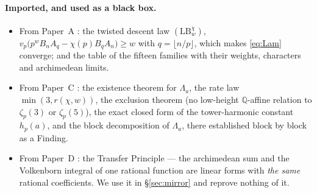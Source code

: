\documentclass[11pt,reqno]{article}
\newcommand{\QQ}{\mathbb{Q}}
\newcommand{\vp}{v_p}
\newcommand{\floor}[1]{\lfloor #1 \rfloor}
\theoremstyle{plain}
\theoremstyle{definition}
\theoremstyle{remark}
\numberwithin{equation}{section}
\begin{document}
\paragraph{Imported, and used as a black box.}
\begin{itemize}[leftmargin=1.4em]
\item From Paper~A \cite{PaperA}: the twisted descent law $(\mathrm{LB}^\chi_w)$,
  $\vp\bigl(p^wB_nA_q-\chi(p)B_qA_n\bigr)\ge w$ with $q=\floor{n/p}$, which makes
  \eqref{eq:Lam} converge; and the table of the fifteen families with their
  weights, characters and archimedean limits.
\item From Paper~C \cite{PaperC}: the existence theorem for $\Lambda_a$, the rate
  law $\min(3,r(\chi,w))$, the exclusion theorem (no low-height $\QQ$-affine
  relation to $\zeta_p(3)$ or $\zeta_p(5)$), the exact closed form of the
  tower-harmonic constant $h_p(a)$, and the block decomposition of $\Lambda_a$,
  there established block by block as a Finding.
\item From Paper~D \cite{PaperD}: the Transfer Principle --- the archimedean sum
  and the Volkenborn integral of one rational function are linear forms with
  \emph{the same} rational coefficients.  We use it in \S\ref{sec:mirror} and
  reprove nothing of it.
\end{itemize}
\end{document}
